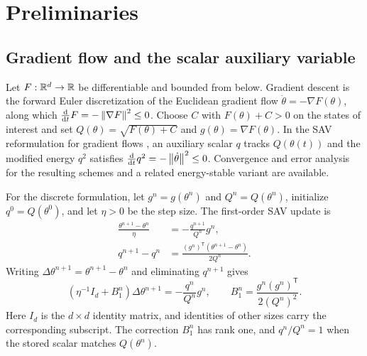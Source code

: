\section{Preliminaries}
\label{sec:background}

\subsection{Gradient flow and the scalar auxiliary variable}

Let \(F:\mathbb{R}^d\to\mathbb{R}\) be differentiable and bounded from below. Gradient descent
is the forward Euler discretization of the Euclidean gradient flow
\(\dot\theta=-\nabla F(\theta)\), along which
\(\tfrac{\mathrm d}{\mathrm dt}F=-\left\lVert\nabla F\right\rVert^{2}\leq0\). Choose \(C\)
with \(F(\theta)+C>0\) on the states of interest and set
\(Q(\theta)=\sqrt{F(\theta)+C}\) and \(g(\theta)=\nabla F(\theta)\). In the SAV
reformulation for gradient flows \cite{shen2018sav,shen2019savreview}, an
auxiliary scalar \(q\) tracks \(Q(\theta(t))\) and the modified energy
\(q^2\) satisfies
\(\tfrac{\mathrm d}{\mathrm dt}q^2=-\left\lVert\dot\theta\right\rVert^{2}\leq0\).
Convergence and error analysis for the resulting schemes
\cite{shen2018convergence} and a related energy-stable variant
\cite{huang2020newsav} are available.

For the discrete formulation, let \(g^n=g(\theta^n)\) and
\(Q^n=Q(\theta^n)\), initialize \(q^0=Q(\theta^0)\), and let \(\eta>0\) be
the step size. The first-order SAV update is
\begin{subequations}
\label{eq:discrete-sav-coupled}
\begin{align}
  \frac{\theta^{n+1}-\theta^n}{\eta}
  &=-\frac{q^{n+1}}{Q^n}g^n,
  \label{eq:discrete-sav-theta}\\
  q^{n+1}-q^n
  &=\frac{(g^n)^{\mathsf T}(\theta^{n+1}-\theta^n)}{2Q^n}.
  \label{eq:discrete-sav-q}
\end{align}
\end{subequations}
Writing \(\Delta\theta^{n+1}=\theta^{n+1}-\theta^n\) and eliminating
\(q^{n+1}\) gives
\begin{equation}
  \left(\eta^{-1}I_d+B_1^n\right)\Delta\theta^{n+1}
  =-\frac{q^n}{Q^n}g^n,
  \qquad
  B_1^n=
  \frac{g^n(g^n)^{\mathsf T}}{2(Q^n)^2}.
  \label{eq:sav-eliminated}
\end{equation}
Here \(I_d\) is the \(d\times d\) identity matrix, and identities of other
sizes carry the corresponding subscript. The correction \(B_1^n\) has rank
one, and \(q^n/Q^n=1\) when the stored scalar matches \(Q(\theta^n)\).

